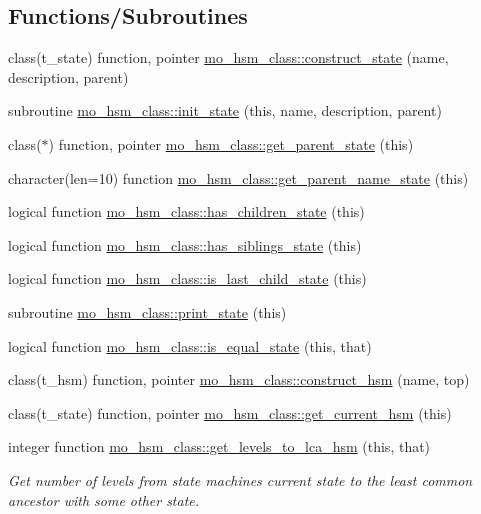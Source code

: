 \subsection*{Functions/\+Subroutines}
\begin{DoxyCompactItemize}
\item 
class(t\+\_\+state) function, pointer \hyperlink{namespacemo__hsm__class_a70dc953037835bbb1d4f9546358afc1a}{mo\+\_\+hsm\+\_\+class\+::construct\+\_\+state} (name, description, parent)
\item 
subroutine \hyperlink{namespacemo__hsm__class_adec9511e26e34688b27f77dbf240d1b8}{mo\+\_\+hsm\+\_\+class\+::init\+\_\+state} (this, name, description, parent)
\item 
class($\ast$) function, pointer \hyperlink{namespacemo__hsm__class_aeb0efc21cd23d8e5f25d180b4d6d1732}{mo\+\_\+hsm\+\_\+class\+::get\+\_\+parent\+\_\+state} (this)
\item 
character(len=10) function \hyperlink{namespacemo__hsm__class_a0af75a4141f966bb6120f904adc503b2}{mo\+\_\+hsm\+\_\+class\+::get\+\_\+parent\+\_\+name\+\_\+state} (this)
\item 
logical function \hyperlink{namespacemo__hsm__class_a4192fae85f192ad67ffbc0dad626de15}{mo\+\_\+hsm\+\_\+class\+::has\+\_\+children\+\_\+state} (this)
\item 
logical function \hyperlink{namespacemo__hsm__class_a11c2140f1e1e70b7dad448d6daf2ba83}{mo\+\_\+hsm\+\_\+class\+::has\+\_\+siblings\+\_\+state} (this)
\item 
logical function \hyperlink{namespacemo__hsm__class_adac6a2e8410f3b138009c2c2291847a3}{mo\+\_\+hsm\+\_\+class\+::is\+\_\+last\+\_\+child\+\_\+state} (this)
\item 
subroutine \hyperlink{namespacemo__hsm__class_a3b7ef41ab70fdbb3845f2671817a8299}{mo\+\_\+hsm\+\_\+class\+::print\+\_\+state} (this)
\item 
logical function \hyperlink{namespacemo__hsm__class_a4c53766ff61bbab072f807e110cd597e}{mo\+\_\+hsm\+\_\+class\+::is\+\_\+equal\+\_\+state} (this, that)
\item 
class(t\+\_\+hsm) function, pointer \hyperlink{namespacemo__hsm__class_a4729d1a17af52e151e4d3780d20b05e6}{mo\+\_\+hsm\+\_\+class\+::construct\+\_\+hsm} (name, top)
\item 
class(t\+\_\+state) function, pointer \hyperlink{namespacemo__hsm__class_a72876473c90113f0d9df43a64308c97a}{mo\+\_\+hsm\+\_\+class\+::get\+\_\+current\+\_\+hsm} (this)
\item 
integer function \hyperlink{namespacemo__hsm__class_a7a3a363368c4697a4f4b6c2e76b67be1}{mo\+\_\+hsm\+\_\+class\+::get\+\_\+levels\+\_\+to\+\_\+lca\+\_\+hsm} (this, that)
\begin{DoxyCompactList}\small\item\em Get number of levels from state machines current state to the least common ancestor with some other state. \end{DoxyCompactList}\end{DoxyCompactItemize}

